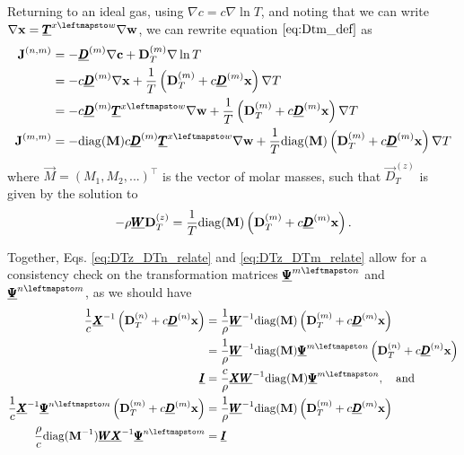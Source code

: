 Returning to an ideal gas, using $\nabla c = c \nabla \ln T$, and noting that we can write $\nabla \vec{x} = \Mat{T}^{x \leftmapsto w} \nabla \Vec{w}$, we can rewrite equation $\eqref{eq:Dtm_def}$ as 
\begin{equation}
    \begin{split}
        \Vec{J}^{(n, m)} &= - \Mat{D}^{(m)} \nabla \Vec{c} + \Vec{D}_T^{(m)} \nabla \ln T \\
        &= - c \Mat{D}^{(m)} \nabla \Vec{x} + \frac{1}{T} \left( \Vec{D}_T^{(m)} + c \Mat{D}^{(m)}\Vec{x}\right) \nabla T \\
        &= - c \Mat{D}^{(m)} \Mat{T}^{x \leftmapsto w} \nabla \Vec{w} + \frac{1}{T} \left( \Vec{D}_T^{(m)} + c \Mat{D}^{(m)}\Vec{x}\right) \nabla T \\
        \Vec{J}^{(m, m)} &= - \diag(\Vec{M}) c \Mat{D}^{(m)} \Mat{T}^{x \leftmapsto w} \nabla \Vec{w} + \frac{1}{T} \diag(\Vec{M}) \left( \Vec{D}_T^{(m)} + c \Mat{D}^{(m)}\Vec{x}\right) \nabla T
    \end{split}
\end{equation}
where $\Vec{M} = (M_1, M_2, ...)^{\top}$ is the vector of molar masses, such that $\Vec{D}_T^{(z)}$ is given by the solution to
\begin{equation}
    - \rho \underline{\pmb{W}} \boldsymbol{\mathrm{D}}_T^{(z)} = \frac{1}{T} \mathrm{diag}(\boldsymbol{\mathrm{M}}) \left( \boldsymbol{\mathrm{D}}_T^{(m)} + c \underline{\pmb{D}}^{(m)}\boldsymbol{\mathrm{x}}\right).
    \label{eq:DTz_DTm_relate}
\end{equation}

Together, Eqs. \eqref{eq:DTz_DTn_relate} and \eqref{eq:DTz_DTm_relate} allow for a consistency check on the transformation matrices $\Mat{\Psi}^{m \leftmapsto n}$ and $\Mat{\Psi}^{n \leftmapsto m}$, as we should have
\begin{equation}
    \begin{split}
        \frac{1}{c} \Mat{X}^{-1}\left( \Vec{D}_T^{(n)} + c \Mat{D}^{(n)}\Vec{x}\right) &= \frac{1}{\rho} \Mat{W}^{-1} \diag(\Vec{M}) \left( \Vec{D}_T^{(m)} + c \Mat{D}^{(m)}\Vec{x}\right) \\
        &= \frac{1}{\rho} \Mat{W}^{-1} \diag(\Vec{M}) \Mat{\Psi}^{m \leftmapsto n} \left( \Vec{D}_T^{(n)} + c \Mat{D}^{(n)}\Vec{x}\right) \\
        \Mat{I} &= \frac{c}{\rho} \Mat{X} \Mat{W}^{-1} \diag(\Vec{M}) \Mat{\Psi}^{m \leftmapsto n}, \quad \text{and} \\
        \frac{1}{c} \Mat{X}^{-1} \Mat{\Psi}^{n \leftmapsto m} \left( \Vec{D}_T^{(m)} + c \Mat{D}^{(m)}\Vec{x}\right) &= \frac{1}{\rho} \Mat{W}^{-1} \diag(\Vec{M}) \left( \Vec{D}_T^{(m)} + c \Mat{D}^{(m)}\Vec{x}\right) \\
        \frac{\rho}{c} \diag(\Vec{M}^{-1}) \Mat{W} \Mat{X}^{-1} \Mat{\Psi}^{n \leftmapsto m} &= \Mat{I}
    \end{split}
\end{equation}

